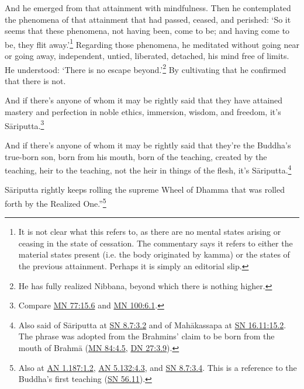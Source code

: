 \documentclass[12pt,openany]{book}%
\begin{document}
And he emerged from that attainment with mindfulness. Then he contemplated the phenomena of that attainment that had passed, ceased, and perished: ‘So it seems that these phenomena, not having been, come to be; and having come to be, they flit away.’\footnote{It is not clear what this refers to, as there are no mental states arising or ceasing in the state of cessation. The commentary says it refers to either the material states present (i.e. the body originated by kamma) or the states of the previous attainment. Perhaps it is simply an editorial slip. } Regarding those phenomena, he meditated without going near or going away, independent, untied, liberated, detached, his mind free of limits. He understood: ‘There is no escape beyond.’\footnote{He has fully realized Nibbana, beyond which there is nothing higher. } By cultivating that he confirmed that there is not. 

And if there’s anyone of whom it may be rightly said that they have attained mastery and perfection in noble ethics, immersion, wisdom, and freedom, it’s \textsanskrit{Sāriputta}.\footnote{Compare \href{https://suttacentral.net/mn77/en/sujato\#15.6}{MN 77:15.6} and \href{https://suttacentral.net/mn100/en/sujato\#6.1}{MN 100:6.1}. } 

And if there’s anyone of whom it may be rightly said that they’re the Buddha’s true-born son, born from his mouth, born of the teaching, created by the teaching, heir to the teaching, not the heir in things of the flesh, it’s \textsanskrit{Sāriputta}.\footnote{Also said of \textsanskrit{Sāriputta} at \href{https://suttacentral.net/sn8.7/en/sujato\#3.2}{SN 8.7:3.2} and of \textsanskrit{Mahākassapa} at \href{https://suttacentral.net/sn16.11/en/sujato\#15.2}{SN 16.11:15.2}. The phrase was adopted from the Brahmins’ claim to be born from the mouth of \textsanskrit{Brahmā} (\href{https://suttacentral.net/mn84/en/sujato\#4.5}{MN 84:4.5}, \href{https://suttacentral.net/dn27/en/sujato\#3.9}{DN 27:3.9}). } 

\textsanskrit{Sāriputta} rightly keeps rolling the supreme Wheel of Dhamma that was rolled forth by the Realized One.”\footnote{Also at \href{https://suttacentral.net/an1.187/en/sujato\#1.2}{AN 1.187:1.2}, \href{https://suttacentral.net/an5.132/en/sujato\#4.3}{AN 5.132:4.3}, and \href{https://suttacentral.net/sn8.7/en/sujato\#3.4}{SN 8.7:3.4}. This is a reference to the Buddha’s first teaching (\href{https://suttacentral.net/sn56.11/en/sujato}{SN 56.11}). } 
\end{document}
